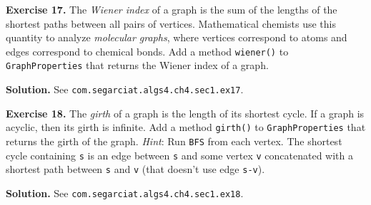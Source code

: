 \documentclass[12pt, a4paper]{article}
\newenvironment{ex}[2][Exercise]
{\par\medskip\noindent \textbf{#1 #2.}}
{\medskip}
\newenvironment{sol}[1][Solution]
{\par\medskip\noindent \textbf{#1.} }
{\medskip}
\begin{document}
	\begin{ex}{17}
		The \emph{Wiener index} of a graph is the sum of the lengths of the shortest
		paths between all pairs of vertices. Mathematical chemists use this
		quantity to analyze \emph{molecular graphs}, where vertices correspond to
		atoms and edges correspond to chemical bonds. Add a method \texttt{wiener()}
		to \texttt{GraphProperties} that returns the Wiener index of a graph.
	\end{ex}
	\begin{sol}
		See \texttt{com.segarciat.algs4.ch4.sec1.ex17}.
	\end{sol}
	\begin{ex}{18}
		The \emph{girth} of a graph is the length of its shortest cycle. If a graph is
		acyclic, then its girth is infinite. Add a method \texttt{girth()} to
		\texttt{GraphProperties} that returns the girth of the graph. \emph{Hint}: Run
		\texttt{BFS} from each vertex. The shortest cycle containing \texttt{s} is an
		edge between \texttt{s} and some vertex \texttt{v} concatenated with a shortest
		path between \texttt{s} and \texttt{v} (that doesn't use edge \texttt{s-v}).
	\end{ex}
	\begin{sol}
		See \texttt{com.segarciat.algs4.ch4.sec1.ex18}.
	\end{sol}
	\pagebreak
	\printbibliography
\end{document}
